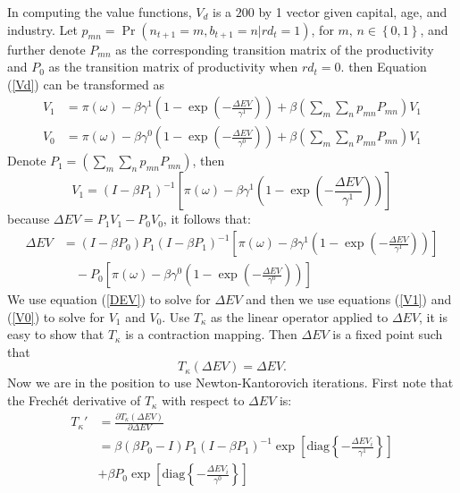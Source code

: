 \documentclass[11pt]{article}
\begin{document}
In computing the value functions, $V_{d}$ is a $200$ by 1 vector
given capital, age, and industry. Let $p_{mn}=\Pr\left(n_{t+1}=m,b_{t+1}=n|rd_{t}=1\right)$,
for $m,\,n\in\left\{ 0,1\right\} $, and further denote $P_{mn}$
as the corresponding transition matrix of the productivity and $P_{0}$
as the transition matrix of productivity when $rd_{t}=0$. then Equation
(\ref{Vd}) can be transformed as 
\begin{align}
V_{1} & =\pi\left(\omega\right)-\beta\gamma^{1}\left(1-\exp\left(-\frac{\Delta EV}{\gamma^{1}}\right)\right)+\beta\left(\sum_{m}\sum_{n}p_{mn}P_{mn}\right)V_{1}\label{V1}\\
V_{0} & =\pi\left(\omega\right)-\beta\gamma^{0}\left(1-\exp\left(-\frac{\Delta EV}{\gamma^{0}}\right)\right)+\beta\left(\sum_{m}\sum_{n}p_{mn}P_{mn}\right)V_{1}\label{V0}
\end{align}
Denote $P_{1}=\left(\sum_{m}\sum_{n}p_{mn}P_{mn}\right)$, then
\[
V_{1}=\left(I-\beta P_{1}\right)^{-1}\left[\pi\left(\omega\right)-\beta\gamma^{1}\left(1-\exp\left(-\frac{\Delta EV}{\gamma^{1}}\right)\right)\right]
\]
 because $\Delta EV=P_{1}V_{1}-P_{0}V_{0}$, it follows that:
\begin{align}
\Delta EV & =\left(I-\beta P_{0}\right)P_{1}\left(I-\beta P_{1}\right)^{-1}\left[\pi\left(\omega\right)-\beta\gamma^{1}\left(1-\exp\left(-\frac{\Delta EV}{\gamma^{1}}\right)\right)\right]\label{DEV}\\
 & \quad-P_{0}\left[\pi\left(\omega\right)-\beta\gamma^{0}\left(1-\exp\left(-\frac{\Delta EV}{\gamma^{0}}\right)\right)\right]\nonumber 
\end{align}
We use equation (\ref{DEV}) to solve for $\Delta EV$ and then we
use equations (\ref{V1}) and (\ref{V0}) to solve for $V_{1}$ and
$V_{0}$. Use $T_{\kappa}$ as the linear operator applied to $\Delta EV$,
it is easy to show that $T_{\kappa}$ is a contraction mapping. Then
$\Delta EV$ is a fixed point such that 
\[
T_{\kappa}\left(\Delta EV\right)=\Delta EV.
\]
Now we are in the position to use Newton-Kantorovich iterations.
First note that the Frech\'{e}t derivative of $T_{\kappa}$ with
respect to $\Delta EV$ is:
\begin{align}
T_{\kappa}' & =\frac{\partial T_{\kappa}\left(\Delta EV\right)}{\partial\Delta EV}\\
 & =\beta\left(\beta P_{0}-I\right)P_{1}\left(I-\beta P_{1}\right)^{-1}\exp\left[\text{diag}\left\{ -\frac{\Delta EV_{i}}{\gamma^{1}}\right\} \right]\nonumber \\
 & +\beta P_{0}\exp\left[\text{diag}\left\{ -\frac{\Delta EV_{i}}{\gamma^{0}}\right\} \right]\nonumber 
\end{align}
\end{document}
